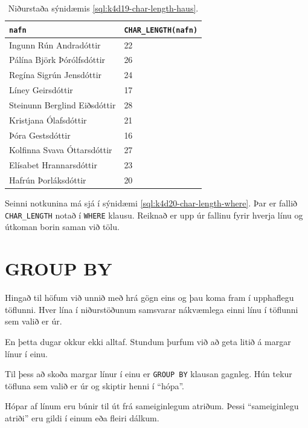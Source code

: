\begin{table}
\centering
\caption[Lengd nafna]{Niðurstaða sýnidæmis \ref{sql:k4d19-char-length-haus}.}
\label{tafla:lengd-nafna}
\begin{tabular}{ll}
\toprule
\verb|nafn|&\verb|CHAR_LENGTH(nafn)|\\
\midrule
Ingunn Rún Andradóttir&22\\
Pálína Björk Þórólfsdóttir&26\\
Regína Sigrún Jensdóttir&24\\
Líney Geirsdóttir&17\\
Steinunn Berglind Eiðsdóttir&28\\
Kristjana Ólafsdóttir&21\\
Þóra Gestsdóttir&16\\
Kolfinna Svava Óttarsdóttir&27\\
Elísabet Hrannarsdóttir&23\\
Hafrún Þorláksdóttir&20\\
\bottomrule
\end{tabular}
\end{table}

Seinni notkunina má sjá í sýnidæmi \ref{sql:k4d20-char-length-where}. Þar er fallið \verb|CHAR_LENGTH| notað í \verb|WHERE| klausu. Reiknað er upp úr fallinu fyrir hverja línu og útkoman borin saman við tölu.

\begin{example}
\caption[CHAR\_LENGTH í WHERE klausu]{\emph{SELECT} skipun sem finnur nöfn allra nemenda sem heita sextán stafa nafni (að bilum meðtöldum).}
\label{sql:k4d20-char-length-where}
\centering
{}
\end{example}

\section{GROUP BY}
Hingað til höfum við unnið með hrá gögn eins og þau koma fram í upphaflegu töflunni. Hver lína í niðurstöðunum samsvarar nákvæmlega einni línu í töflunni sem valið er úr.

En þetta dugar okkur ekki alltaf. Stundum þurfum við að geta litið á margar línur í einu.

Til þess að skoða margar línur í einu er \verb|GROUP BY| klausan gagnleg. Hún tekur töfluna sem valið er úr og skiptir henni í ``hópa''.

Hópar af línum eru búnir til út frá sameiginlegum atriðum. Þessi ``sameiginlegu atriði'' eru gildi í einum eða fleiri dálkum. 

